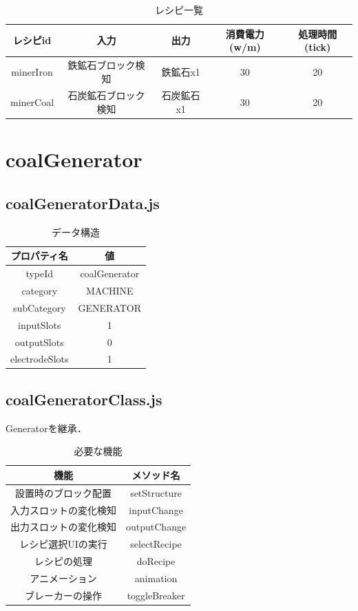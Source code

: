 \documentclass[uplatex,dvipdfmx,report]{jlreq}
\begin{document}
\begin{table}[H]
    \centering
    \caption{レシピ一覧}
    \begin{tabular}{ccccc}
        \hline
        レシピid & 入力 & 出力 & 消費電力(w/m) & 処理時間(tick) \\
        \hline
        \hline
        minerIron & 鉄鉱石ブロック検知 & 鉄鉱石x1 & 30 & 20 \\
        minerCoal & 石炭鉱石ブロック検知 & 石炭鉱石x1 & 30 & 20 \\
        \hline
    \end{tabular}
\end{table}

\section{coalGenerator}

\subsection{coalGeneratorData.js}

\begin{table}[H]
    \centering
    \caption{データ構造}
    \begin{tabular}{cc}
        \hline
        プロパティ名 & 値 \\
        \hline
        \hline
        typeId & coalGenerator \\
        category & MACHINE \\
        subCategory & GENERATOR \\
        inputSlots & 1 \\
        outputSlots & 0 \\
        electrodeSlots & 1 \\
        \hline
    \end{tabular}
\end{table}

\subsection{coalGeneratorClass.js}

Generatorを継承．

\begin{table}[H]
    \centering
    \caption{必要な機能}
    \begin{tabular}{cc}
        \hline
        機能 & メソッド名 \\
        \hline
        \hline
        設置時のブロック配置 & setStructure \\
        入力スロットの変化検知 & inputChange \\
        出力スロットの変化検知 & outputChange \\
        レシピ選択UIの実行 & selectRecipe \\
        レシピの処理 & doRecipe \\
        アニメーション & animation \\
        ブレーカーの操作 & toggleBreaker \\
        \hline
    \end{tabular}
\end{table}
\end{document}
